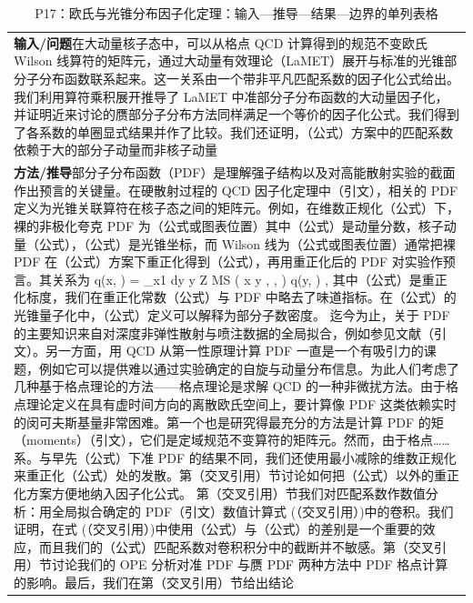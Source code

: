 \documentclass[UTF8,11pt,oneside]{ctexbook}
\begin{document}
\begin{table}[htbp]
  \centering
  \caption*{P17：欧氏与光锥分布因子化定理：输入—推导—结果—边界的单列表格}
  \small
  \begin{tabular}{@{}p{}@{}}
    \toprule
    \textbf{输入/问题}\quad 在大动量核子态中，可以从格点 QCD 计算得到的规范不变欧氏 Wilson 线算符的矩阵元，通过大动量有效理论（LaMET）展开与标准的光锥部分子分布函数联系起来。这一关系由一个带非平凡匹配系数的因子化公式给出。我们利用算符乘积展开推导了 LaMET 中准部分子分布函数的大动量因子化，并证明近来讨论的赝部分子分布方法同样满足一个等价的因子化公式。我们得到了各系数的单圈显式结果并作了比较。我们还证明，（公式）方案中的匹配系数依赖于大的部分子动量而非核子动量 \\
    \textbf{方法/推导}\quad 部分子分布函数（PDF）是理解强子结构以及对高能散射实验的截面作出预言的关键量。在硬散射过程的 QCD 因子化定理中（引文），相关的 PDF 定义为光锥关联算符在核子态之间的矩阵元。例如，在维数正规化（公式）下，裸的非极化夸克 PDF 为（公式或图表位置）其中（公式）是动量分数，核子动量（公式），（公式）是光锥坐标，而 Wilson 线为（公式或图表位置）通常把裸 PDF 在（公式）方案下重正化得到（公式），再用重正化后的 PDF 对实验作预言。其关系为 q(x, ) = \_x1 dy y Z MS ( x y , , ) q(y, ) , 其中（公式）是重正化标度，我们在重正化常数（公式）与 PDF 中略去了味道指标。在（公式）的光锥量子化中，（公式）定义可以解释为部分子数密度。 迄今为止，关于 PDF 的主要知识来自对深度非弹性散射与喷注数据的全局拟合，例如参见文献（引文）。另一方面，用 QCD 从第一性原理计算 PDF 一直是一个有吸引力的课题，例如它可以提供难以通过实验确定的自旋与动量分布信息。为此人们考虑了几种基于格点理论的方法——格点理论是求解 QCD 的一种非微扰方法。由于格点理论定义在具有虚时间方向的离散欧氏空间上，要计算像 PDF 这类依赖实时的闵可夫斯基量非常困难。第一个也是研究得最充分的方法是计算 PDF 的矩（moments）（引文），它们是定域规范不变算符的矩阵元。然而，由于格点……系。与早先（公式）下准 PDF 的结果不同，我们还使用最小减除的维数正规化来重正化（公式）处的发散。第（交叉引用）节讨论如何把（公式）以外的重正化方案方便地纳入因子化公式。 第（交叉引用）节我们对匹配系数作数值分析：用全局拟合确定的 PDF（引文）数值计算式 (（交叉引用）)中的卷积。我们证明，在式 (（交叉引用）)中使用（公式）与（公式）的差别是一个重要的效应，而且我们的（公式）匹配系数对卷积积分中的截断并不敏感。第（交叉引用）节讨论我们的 OPE 分析对准 PDF 与赝 PDF 两种方法中 PDF 格点计算的影响。最后，我们在第（交叉引用）节给出结论 \\

\end{tabular}
\end{table}
\end{document}
